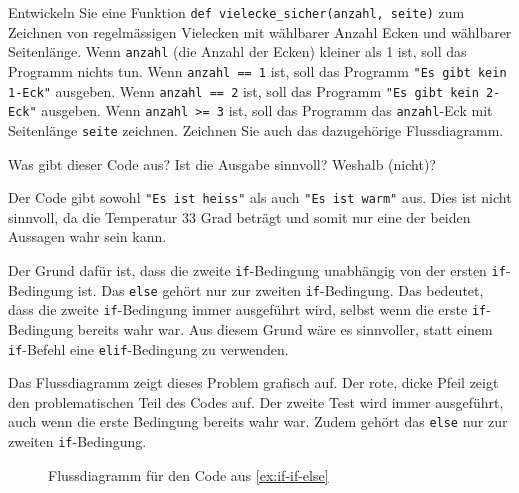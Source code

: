 \begin{myexercise}
	Entwickeln Sie eine Funktion \lstinline|def vielecke_sicher(anzahl, seite)| zum Zeichnen von regelmässigen Vielecken mit wählbarer Anzahl Ecken und wählbarer Seitenlänge. Wenn \lstinline|anzahl| (die Anzahl der Ecken) kleiner als 1 ist, soll das Programm nichts tun. Wenn \lstinline|anzahl == 1| ist, soll das Programm
	\lstinline|"Es gibt kein 1-Eck"| ausgeben. Wenn \lstinline|anzahl == 2| ist, soll das Programm
	\lstinline|"Es gibt kein 2-Eck"| ausgeben. Wenn \lstinline|anzahl >= 3| ist, soll das Programm das \lstinline|anzahl|-Eck mit Seitenlänge \lstinline|seite| zeichnen. Zeichnen Sie auch das dazugehörige Flussdiagramm.
	\begin{myanswer}
		
	\end{myanswer}
\end{myexercise}

\begin{myexercise}\label{ex:if-if-else}
	Was gibt dieser Code aus? Ist die Ausgabe sinnvoll? Weshalb (nicht)?
	
	\begin{myanswer}
		Der Code gibt sowohl \lstinline|"Es ist heiss"| als auch \lstinline|"Es ist warm"| aus. Dies ist nicht sinnvoll, da die Temperatur 33 Grad beträgt und somit nur eine der beiden Aussagen wahr sein kann.

		Der Grund dafür ist, dass die zweite \lstinline|if|-Bedingung unabhängig von der ersten \lstinline|if|-Bedingung ist. Das \lstinline|else| gehört nur zur zweiten \lstinline|if|-Bedingung. Das bedeutet, dass die zweite \lstinline|if|-Bedingung immer ausgeführt wird, selbst wenn die erste \lstinline|if|-Bedingung bereits wahr war. Aus diesem Grund wäre es sinnvoller, statt einem \lstinline|if|-Befehl eine \lstinline|elif|-Bedingung zu verwenden.

		Das Flussdiagramm zeigt dieses Problem grafisch auf. Der rote, dicke Pfeil zeigt den problematischen Teil des Codes auf. Der zweite Test wird immer ausgeführt, auch wenn die erste Bedingung bereits wahr war. Zudem gehört das \lstinline|else| nur zur zweiten \lstinline|if|-Bedingung.

		\begin{figure}[H]
			\centering
			
			\caption{Flussdiagramm für den Code aus \cref{ex:if-if-else}}
			\label{fig:if-if-else}
		\end{figure}
	\end{myanswer}
\end{myexercise}

